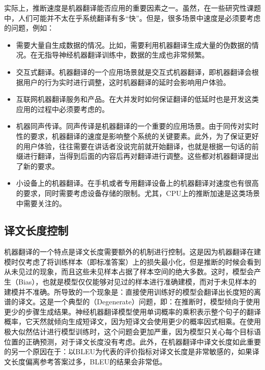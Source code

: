 \parinterval 实际上，推断速度是机器翻译能否应用的重要因素之一。虽然，在一些研究性课题中，人们可能并不太在乎系统翻译有多``快''。但是，很多场景中速度是必须要考虑的问题，例如：

\begin{itemize}
\vspace{0.5em}
\item 需要大量自生成数据的情况。比如，需要利用机器翻译生成大量的伪数据的情况。在无指导神经机器翻译训练中，数据的生成也非常频繁。
\vspace{0.5em}
\item 交互式翻译。机器翻译的一个应用场景就是交互式机器翻译\cite{Domingo2017Segment,Alvaro2017Interactive,DBLP:conf/emnlp/NepveuLLF04}，即机器翻译会根据用户的行为实时进行调整，这时机器翻译的延时会影响用户体验。
\vspace{0.5em}
\item 互联网机器翻译服务和产品。在大并发时如何保证翻译的低延时也是开发这类应用的过程中必须要考虑的。
\vspace{0.5em}
\item 机器同声传译。同声传译是机器翻译的一个重要的应用场景。由于同传对实时性的要求，机器翻译的速度是影响整个系统的关键要素。此外，为了保证更好的用户体验，往往需要在讲话者没说完前就开始翻译，也就是根据一句话的前缀进行翻译，当得到后面的内容后再对翻译进行调整。这些都对机器翻译提出了新的要求\cite{DBLP:journals/corr/abs-1810-08398}。
\vspace{0.5em}
\item 小设备上的机器翻译。在手机或者专用翻译设备上的机器翻译对速度也有很高的要求，同时需要考虑设备存储的限制。尤其，CPU上的推断加速是这类场景中需要关注的。
\vspace{0.5em}
\end{itemize}


\subsection{译文长度控制}

\parinterval 机器翻译的一个特点是译文长度需要额外的机制进行控制。这是因为机器翻译在建模时仅考虑了将训练样本（即标准答案）上的损失最小化，但是推断的时候会看到从未见过的现象，而且这些未见样本占据了样本空间的绝大多数。这时，模型会产生{\small{}}（Bias），也就是模型仅仅能够对见过的样本进行准确建模，而对于未见样本的建模并不准确。所导致的一个现象是：直接使用训练好的模型会翻译出长度短的离谱的译文。这是一个典型的{\small{}}（Degenerate）问题，即：在推断时，模型倾向于使用更少的步骤生成结果。神经机器翻译模型使用单词概率的乘积表示整个句子的翻译概率，它天然就倾向生成短译文，因为短译文会使用更少的概率因式相乘。在使用极大似然估计进行模型训练时，这个问题会更加严重，因为模型只关心每个目标语位置的正确预测，对于译文长度没有考虑。此外，在机器翻译中译文长度如此重要的另一个原因在于：以BLEU为代表的评价指标对译文长度是非常敏感的，如果译文长度偏离参考答案过多，BLEU的结果会非常低。

